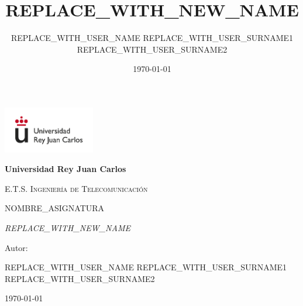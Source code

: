\documentclass[12pt, a4paper]{report}
\title{REPLACE_WITH_NEW_NAME}
\author{REPLACE_WITH_USER_NAME REPLACE_WITH_USER_SURNAME1 REPLACE_WITH_USER_SURNAME2}
\date{\today}
\begin{document}
	\begin{titlepage}
		\centering
		{\includegraphics[width=0.3\textwidth]{logo}\par}
		\vspace{1cm}
		{\bfseries\LARGE Universidad Rey Juan Carlos \par}
		\vspace{1cm}
		{\scshape\Large E.T.S. Ingeniería de Telecomunicación \par}
		\vspace{3cm}
		{\scshape\Huge NOMBRE\_ASIGNATURA \par}
		\vspace{3cm}
		{\itshape\Large REPLACE_WITH_NEW_NAME \par}
		\vfill
		{\Large Autor: \par}
		{\Large REPLACE_WITH_USER_NAME REPLACE_WITH_USER_SURNAME1 REPLACE_WITH_USER_SURNAME2 \par}
		\vfill
		{\Large \today \par}
	\end{titlepage}

\newpage
\renewcommand{\contentsname}{Contenidos}
\tableofcontents
\newpage
\end{document}
